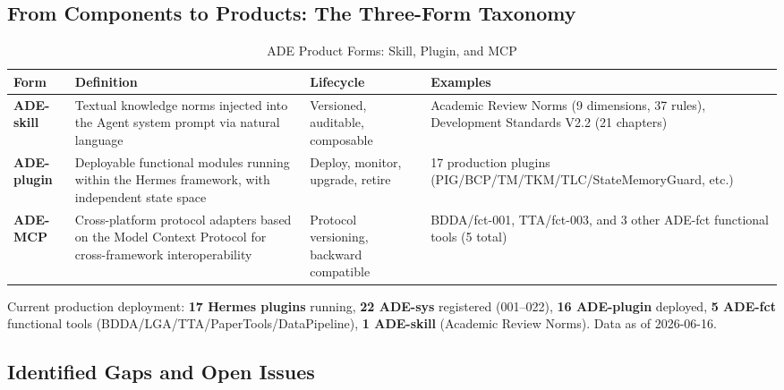 \documentclass[11pt,a4paper]{article}
\begin{document}
\subsection{From Components to Products: The Three-Form Taxonomy}
\label{sec:10.4}

\begin{table}[htbp]
\centering
\caption{ADE Product Forms: Skill, Plugin, and MCP}
\label{tab:three-form}
\begin{tabular}{p{}p{}p{}p{}}
\hline
\textbf{Form} & \textbf{Definition} & \textbf{Lifecycle} & \textbf{Examples} \\
\hline
\textbf{ADE-skill} & Textual knowledge norms injected into the Agent system prompt via natural language & Versioned, auditable, composable & Academic Review Norms (9 dimensions, 37 rules), Development Standards V2.2 (21 chapters) \\
\textbf{ADE-plugin} & Deployable functional modules running within the Hermes framework, with independent state space & Deploy, monitor, upgrade, retire & 17 production plugins (PIG/BCP/TM/TKM/TLC/StateMemoryGuard, etc.) \\
\textbf{ADE-MCP} & Cross-platform protocol adapters based on the Model Context Protocol for cross-framework interoperability & Protocol versioning, backward compatible & BDDA/fct-001, TTA/fct-003, and 3 other ADE-fct functional tools (5 total) \\
\hline
\end{tabular}
\end{table}

Current production deployment: \textbf{17 Hermes plugins} running, \textbf{22 ADE-sys} registered (001--022), \textbf{16 ADE-plugin} deployed, \textbf{5 ADE-fct} functional tools (BDDA/LGA/TTA/PaperTools/DataPipeline), \textbf{1 ADE-skill} (Academic Review Norms). Data as of 2026-06-16.

\subsection{Identified Gaps and Open Issues}
\label{sec:10.5}
\end{document}
